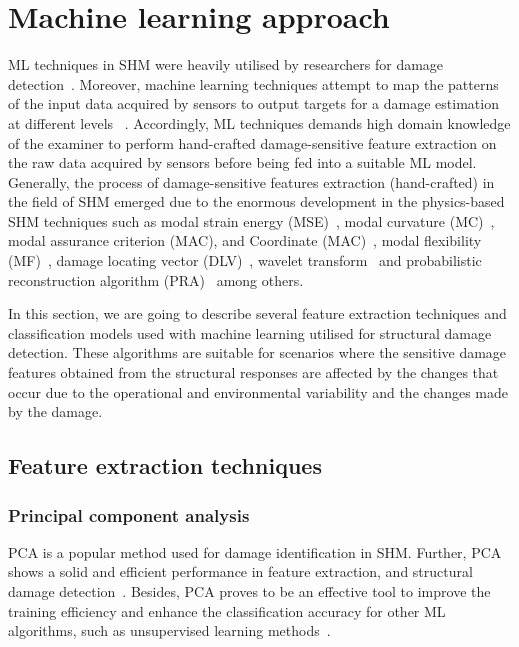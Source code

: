 \section{Machine learning approach}
ML techniques in SHM were heavily utilised by researchers for damage detection~\cite{Doebling1998, alvandi2006assessment, fan2011vibration, raghavan2008effects, su2009identification, Mitra2016}.
Moreover, machine learning techniques attempt to map the patterns of the input data acquired by sensors to output targets for a damage estimation at different levels ~\cite{rytter1993vibrational}.
Accordingly, ML techniques demands high domain knowledge of the examiner to perform hand-crafted damage-sensitive feature extraction on the raw data acquired by sensors before being fed into a suitable ML model.
Generally, the process of damage-sensitive features extraction (hand-crafted) in the field of SHM emerged due to the enormous development in the physics-based SHM techniques such as modal strain energy (MSE)~\cite{Kim}, modal curvature (MC)~\cite{Wahab}, modal assurance criterion (MAC), and Coordinate (MAC)~\cite{Allemang2003}, modal flexibility (MF)~\cite{Jaishi}, damage locating vector (DLV)~\cite{Bernal2002}, wavelet transform~\cite{Staszewski,Kima} and probabilistic reconstruction algorithm (PRA)~\cite{Hay2006} among others.

In this section, we are going to describe several feature extraction techniques and classification models used with machine learning utilised for structural damage detection.
These algorithms are suitable for scenarios where the sensitive damage features obtained from the structural responses are affected by the changes that occur due to the operational and environmental variability and the changes made by the damage.
\subsection{Feature extraction techniques}
\subsubsection{Principal component analysis}
PCA is a popular method used for damage identification in SHM.
Further, PCA shows a solid and efficient performance in feature extraction, and structural damage detection~\cite{liu2014research, wang2014principal, nguyen2010fault}. 
Besides, PCA proves to be an effective tool to improve the training efficiency and enhance the classification accuracy for other ML algorithms, such as unsupervised learning methods~\cite{liu2019rapid, datteo2017statistical, torres2014data}. 

